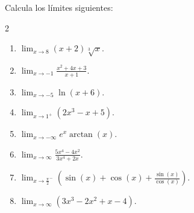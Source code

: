 \documentclass[12pt,a4paper]{article}
\begin{document}
    \begin{problema}
        Calcula los límites siguientes:
        \begin{multicols}{2}
            \begin{enumerate}
                \item[(a)] $\displaystyle\lim_{x\to8}(x+2)\sqrt[3]{x}.$
                \item[(b)] $\displaystyle\lim_{x\to-1}\frac{x^{2}+4x+3}{x+1}.$
                \item[(c)] $\displaystyle\lim_{x\to-5}\ln(x+6).$
                \item[(d)] $\displaystyle\lim_{x\to1^{+}}\left(2x^{3}-x+5\right).$
                \item[(e)] $\displaystyle\lim_{x\to-\infty}e^{x}\arctan(x).$
                \item[(f)] $\displaystyle\lim_{x\to\infty}\frac{5x^{4}-4x^{2}}{3x^{4}+2x}.$
                \item[(g)] $\displaystyle\lim_{x\to\frac{\pi}{2}^{-}}\left(\sin(x)+\cos(x)+\frac{\sin(x)}{\cos(x)}\right).$
                \item[(h)] $\displaystyle\lim_{x\to\infty}\left(3x^{3}-2x^{2}+x-4\right).$
            \end{enumerate}
        \end{multicols}
    \end{problema}
\end{document}
